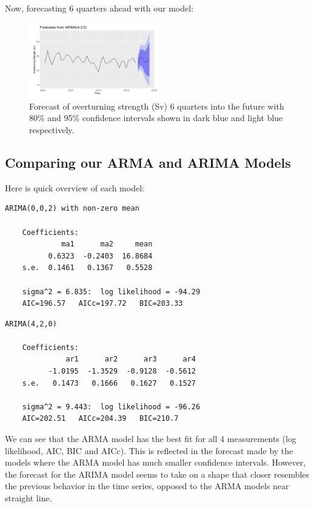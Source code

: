 Now, forecasting 6 quarters ahead with our model:

\begin{figure}[H]
    \centering
    \includegraphics[width=0.50\textwidth]{Sections/ARIMA/Plots/forecast_arima.png}
    \caption{Forecast of overturning strength (Sv) 6 quarters into the future with 80\% and 95\% confidence intervals shown in dark blue and light blue respectively.}
    \label{S2fig:Arima_Forecast}
\end{figure}
\pagebreak
\subsection{Comparing our ARMA and ARIMA Models}

Here is quick overview of each model:

\begin{lstlisting}[caption={ARMA(0,2)}]
    ARIMA(0,0,2) with non-zero mean

    Coefficients:
             ma1      ma2     mean
          0.6323  -0.2403  16.8684
    s.e.  0.1461   0.1367   0.5528
    
    sigma^2 = 6.835:  log likelihood = -94.29
    AIC=196.57   AICc=197.72   BIC=203.33
    \end{lstlisting}

\begin{lstlisting}[caption={ARIMA(4,2,0)}]
    ARIMA(4,2,0)

    Coefficients:
              ar1      ar2      ar3      ar4
          -1.0195  -1.3529  -0.9128  -0.5612
    s.e.   0.1473   0.1666   0.1627   0.1527
    
    sigma^2 = 9.443:  log likelihood = -96.26
    AIC=202.51   AICc=204.39   BIC=210.7
    \end{lstlisting}

    We can see that the ARMA model has the best fit for all 4 measurements (log likelihood, AIC, BIC and AICc). This is reflected in the forecast made by the models where the ARMA model has much smaller confidence intervals. However, the forecast for the ARIMA model seems to take on a shape that closer resembles the previous behavior in the time series, opposed to the ARMA models near straight line.